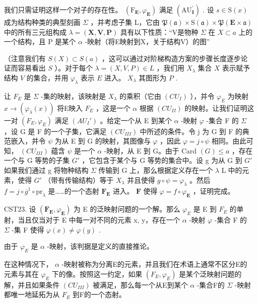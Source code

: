 我们只需证明这样一个对子的存在性。 \((\mathrm{F}_{\mathbf{E}}, \varphi_{\mathbf{E}})\) 满足 \((\mathrm{AU}_{\mathbf{I}}^{\prime})\) . 设 \(s \in \mathrm{S}(x)\) 成为结构种类的典型刻画 \(\Sigma\) ，并考虑子集 L，它由 \(\mathfrak{P}(\mathfrak{a}) \times \mathrm{S}(\mathfrak{a}) \times \mathfrak{P}(\mathbf{E} \times \mathfrak{a})\) 中的所有三元组构成 \(\lambda = (\mathbf{X}, \mathbf{V}, \mathbf{P})\) 具有以下性质：“V是物种 \(\Sigma\) 在 \(X \subset a\) 上的一个结构，且 P 是某个 \(\alpha\) -映射（将E映射到X，关于结构V）的图''

（注意我们有 \(S(X) \subset S(a)\) ，这可以通过对阶梯构造方案的步骤长度逐步论证而容易看出 \(S\) ）。对于每个 \(\lambda = (X, V, P) \in L\) ，我们用 \(X_{\lambda}\) 集合 \(X\) 表示赋予结构 \(V\) 的集合，并用 \(\varphi_{\lambda}\) 表示 \(E\) 进入。 \(X_{\lambda}\) 其图形为 \(P\) .

让 \(F_{E}\) 是 \(\Sigma\) -集的映射，该映射是 \(X_{\lambda}\) 的乘积（它由 \((CU_{I})\) ），并令 \(\varphi_{E}\) 为映射 \(x \to (\varphi_{\lambda}(x))\) 将E映入 \(F_{E}\) ，这是一个 \(\alpha\) 根据 \((CU_{II})\) 的映射。让我们证明这一对 \((F_{E}, \varphi_{E})\) 满足 \((AU_{I}')\) 。给定一个从 E 到某个 \(\alpha\) -映射 \(\varphi\) -集合 F 的 \(\Sigma\) ，设 G 是 F 的一个子集，它满足 \((CU_{III})\) 中所述的条件。令 j 为 G 到 F 的典范嵌入，并令 \(\psi\) 为从 E 到 G 的映射，其图像与 \(\varphi\) ，因此 \(\varphi = j \circ \psi\) 相同。由此可知， \((CU_{III})\) 蕴含 \(\psi\) 是一个 \(\alpha\) -映射，从 E 到 G。由于 Card \((G) \leqslant a\) ，存在一个与 G 等势的子集 \(G'\) ，它包含于某个与 G 等势的集合中。设 g 为从 G 到 \(G'\) 如果我们通过 g 将物种结构 \(\Sigma\) 传输到 G 上，那么根据定义存在一个 \(\lambda\) L 中的元素，使得 \(G'\) （带有传输结构）等于 \(X_{\lambda}\) 并且使得 \(g \circ \psi = \varphi_{\lambda}\) 。然后 \(f = j \circ \overline{g}^1 \circ \mathrm{pr}_{\lambda}\) 是……的一个态射 \(\mathbf{F}_{\mathbf{E}}\) 进入。 \(\mathbf{F}\) 使得 \(\varphi = f \circ \varphi_{\mathbf{E}}\) ，证明完成。

CST23. 设 \((\mathbf{F}_{\mathbf{E}}, \varphi_{\mathbf{E}})\) 为 E 的泛映射问题的一个解。那么 \(\varphi_{E}\) 是 E 到 \(F_{E}\) 的单射，当且仅当对于 E 中每一对不同的元素 x, y，存在一个 \(\alpha\) -映射 \(\varphi\) -集合 F 的 \(\Sigma\) -集 F 使得 \(\varphi(x) \neq \varphi(y)\) .

由于 \(\varphi_{E}\) 是 \(\alpha\) -映射，该判据是定义的直接推论。

在这种情况下， \(\alpha\) -映射被称为分离E的元素，并且我们在术语上通常不区分E的元素与其在 \(\varphi_{E}\) 下的像。按照这一约定，如果 \((F_{E}, \varphi_{E})\) 是某个泛映射问题的解，并且如果条件 \((CU_{III})\) 被满足，那么每一个从E到某个 \(\alpha\) -集合F的 \(\Sigma\) -映射都唯一地延拓为从 \(F_{E}\) 到F的一个态射。


